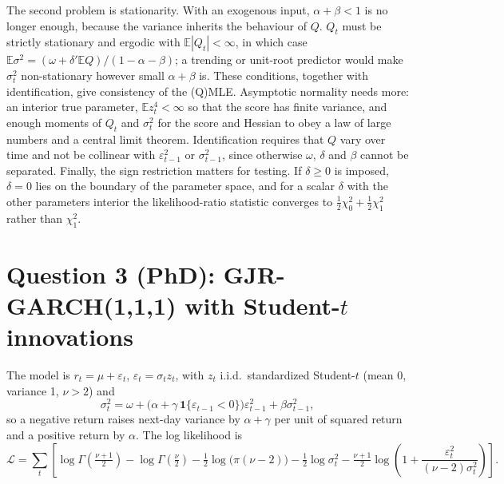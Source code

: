 \documentclass[11pt]{article}
\newcommand{\E}{\mathbb{E}}
\newcommand{\1}{\mathbf{1}}
\begin{document}
The second problem is stationarity. With an exogenous input, $\alpha+\beta<1$ is no longer
enough, because the variance inherits the behaviour of $Q$. $Q_t$ must be strictly stationary
and ergodic with $\E|Q_t|<\infty$, in which case
$\E\sigma^2=(\omega+\delta'\E Q)/(1-\alpha-\beta)$; a trending or unit-root predictor would
make $\sigma_t^2$ non-stationary however small $\alpha+\beta$ is. These conditions, together
with identification, give consistency of the (Q)MLE. Asymptotic normality needs more: an
interior true parameter, $\E z_t^4<\infty$ so that the score has finite variance, and enough
moments of $Q_t$ and $\sigma_t^2$ for the score and Hessian to obey a law of large numbers and a
central limit theorem. Identification
requires that $Q$ vary over time and not be collinear with $\varepsilon_{t-1}^2$ or
$\sigma_{t-1}^2$, since otherwise $\omega$, $\delta$ and $\beta$ cannot be separated. Finally,
the sign restriction matters for testing. If $\delta\ge0$ is imposed, $\delta=0$ lies on the
boundary of the parameter space, and for a scalar $\delta$ with the other parameters interior
the likelihood-ratio statistic converges to $\tfrac12\chi^2_0+\tfrac12\chi^2_1$ rather than
$\chi^2_1$.

\section{\texorpdfstring{Question 3 (PhD): GJR-GARCH(1,1,1) with Student-$t$ innovations}{Question 3 (PhD): GJR-GARCH(1,1,1) with Student-t innovations}}

The model is $r_t=\mu+\varepsilon_t$, $\varepsilon_t=\sigma_tz_t$, with $z_t$ i.i.d.\
standardized Student-$t$ (mean 0, variance 1, $\nu>2$) and
\[
\sigma_t^2=\omega+\big(\alpha+\gamma\,\1\{\varepsilon_{t-1}<0\}\big)\varepsilon_{t-1}^2+\beta\sigma_{t-1}^2 ,
\]
so a negative return raises next-day variance by $\alpha+\gamma$ per unit of squared return
and a positive return by $\alpha$. The log likelihood is
\[
\mathcal L=\sum_t\left[\log\Gamma\!\left(\tfrac{\nu+1}{2}\right)-\log\Gamma\!\left(\tfrac{\nu}{2}\right)
-\tfrac12\log\big(\pi(\nu-2)\big)-\tfrac12\log\sigma_t^2
-\tfrac{\nu+1}{2}\log\!\left(1+\frac{\varepsilon_t^2}{(\nu-2)\sigma_t^2}\right)\right].
\]
\end{document}
